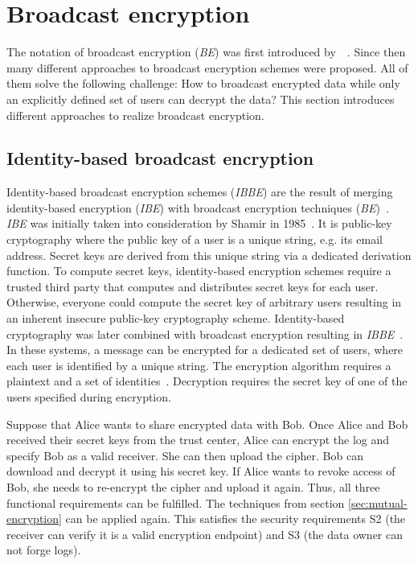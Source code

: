 \documentclass[../main.tex]{subfiles}
\begin{document}
\section{Broadcast encryption}
The notation of broadcast encryption (\textit{BE}) was first introduced by~\citeauthor{fiat1993broadcast}~\cite{fiat1993broadcast}. 
Since then many different approaches to broadcast encryption schemes were proposed. 
All of them solve the following challenge: 
How to broadcast encrypted data while only an explicitly defined set of users can decrypt the data?
This section introduces different approaches to realize broadcast encryption.


\subsection{Identity-based broadcast encryption} 
Identity-based broadcast encryption schemes (\textit{IBBE}) are the result of merging identity-based encryption (\textit{IBE}) with broadcast encryption techniques (\textit{BE})~\cite{Sakai2007}.
\textit{IBE} was initially taken into consideration by Shamir in 1985~\cite{shamir1985}.
It is public-key cryptography where the public key of a user is a unique string, e.g. its email address. 
Secret keys are derived from this unique string via a dedicated derivation function. 
To compute secret keys, identity-based encryption schemes require a trusted third party that computes and distributes secret keys for each user.
Otherwise, everyone could compute the secret key of arbitrary users resulting in an inherent insecure public-key cryptography scheme.
Identity-based cryptography was later combined with broadcast encryption resulting in \textit{IBBE}~\cite{Sakai2007}.
In these systems, a message can be encrypted for a dedicated set of users, where each user is identified by a unique string.
The encryption algorithm requires a plaintext and a set of identities~\cite{shamir1985}.
Decryption requires the secret key of one of the users specified during encryption.

Suppose that Alice wants to share encrypted data with Bob.
Once Alice and Bob received their secret keys from the trust center, Alice can encrypt the log and specify Bob as a valid receiver.
She can then upload the cipher.
Bob can download and decrypt it using his secret key.
If Alice wants to revoke access of Bob, she needs to re-encrypt the cipher and upload it again.
Thus, all three functional requirements can be fulfilled.
The techniques from section \ref{sec:mutual-encryption} can be applied again.
This satisfies the security requirements S2 (the receiver can verify it is a valid encryption endpoint) and S3 (the data owner can not forge logs).
\end{document}
